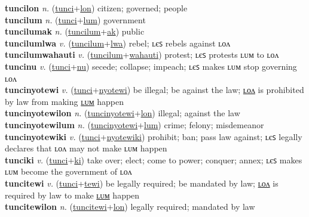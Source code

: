 \textbf{tuncilon} \textit{n.} (\hyperref[tunci]{tunci}+\hyperref[lon]{lon})
citizen; governed; people \label{tuncilon} \\
\textbf{tuncilum} \textit{n.} (\hyperref[tunci]{tunci}+\hyperref[lum]{lum})
government \label{tuncilum} \\
\textbf{tuncilumak} \textit{n.} (\hyperref[tuncilum]{tuncilum}+\hyperref[ak]{ak})
public \label{tuncilumak} \\
\textbf{tuncilumlwa} \textit{v.} (\hyperref[tuncilum]{tuncilum}+\hyperref[lwa]{lwa})
rebel; ʟєꜱ rebels against ʟᴏᴧ \label{tuncilumlwa} \\
\textbf{tuncilumwahauti} \textit{v.} (\hyperref[tuncilum]{tuncilum}+\hyperref[wahauti]{wahauti})
protest; ʟєꜱ protests ʟᴜᴍ to ʟᴏᴧ \label{tuncilumwahauti} \\
\textbf{tuncinu} \textit{v.} (\hyperref[tunci]{tunci}+\hyperref[nu]{nu})
secede; collapse; impeach; ʟєꜱ makes ʟᴜᴍ stop governing ʟᴏᴧ \label{tuncinu} \\
\textbf{tuncinyotewi} \textit{v.} (\hyperref[tunci]{tunci}+\hyperref[nyotewi]{nyotewi})
be illegal; be against the law; \hyperref[tuncinyotewilon]{ʟᴏᴧ} is prohibited by law from making \hyperref[tuncinyotewilum]{ʟᴜᴍ} happen \label{tuncinyotewi} \\
\textbf{tuncinyotewilon} \textit{n.} (\hyperref[tuncinyotewi]{tuncinyotewi}+\hyperref[lon]{lon})
illegal; against the law \label{tuncinyotewilon} \\
\textbf{tuncinyotewilum} \textit{n.} (\hyperref[tuncinyotewi]{tuncinyotewi}+\hyperref[lum]{lum})
crime; felony; misdemeanor \label{tuncinyotewilum} \\
\textbf{tuncinyotewiki} \textit{v.} (\hyperref[tunci]{tunci}+\hyperref[nyotewiki]{nyotewiki})
prohibit; ban; pass law against; ʟєꜱ legally declares that ʟᴏᴧ may not make ʟᴜᴍ happen \label{tuncinyotewiki} \\
\textbf{tunciki} \textit{v.} (\hyperref[tunci]{tunci}+\hyperref[ki]{ki})
take over; elect; come to power; conquer; annex; ʟєꜱ makes ʟᴜᴍ become the government of ʟᴏᴧ \label{tunciki} \\
\textbf{tuncitewi} \textit{v.} (\hyperref[tunci]{tunci}+\hyperref[tewi]{tewi})
be legally required; be mandated by law; \hyperref[tuncitewilon]{ʟᴏᴧ} is required by law to make \hyperref[tuncitewilum]{ʟᴜᴍ} happen \label{tuncitewi} \\
\textbf{tuncitewilon} \textit{n.} (\hyperref[tuncitewi]{tuncitewi}+\hyperref[lon]{lon})
legally required; mandated by law \label{tuncitewilon} \\
